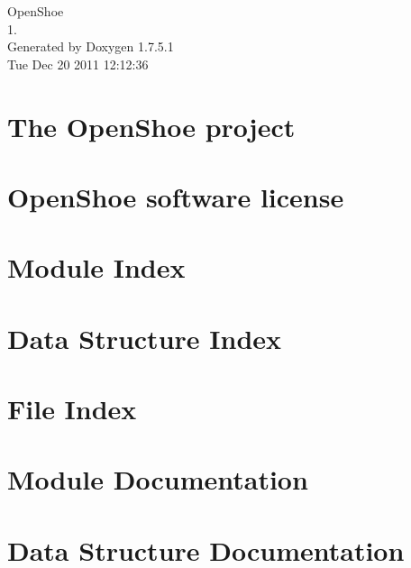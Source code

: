 \documentclass[a4paper]{book}
\begin{document}
\hypersetup{pageanchor=false,citecolor=blue}
\begin{titlepage}
\vspace*{7cm}
\begin{center}
{\Large \-Open\-Shoe \\[1ex]\large 1. }\\
\vspace*{1cm}
{\large \-Generated by Doxygen 1.7.5.1}\\
\vspace*{0.5cm}
{\small Tue Dec 20 2011 12:12:36}\\
\end{center}
\end{titlepage}
\clearemptydoublepage
{}
\tableofcontents
\clearemptydoublepage
{}
\hypersetup{pageanchor=true,citecolor=blue}
\chapter{\-The \-Open\-Shoe project}
\label{index}\hypertarget{index}{}
\chapter{\-Open\-Shoe software license}
\label{isc_license}
\hypertarget{isc_license}{}

\chapter{\-Module \-Index}

\chapter{\-Data \-Structure \-Index}

\chapter{\-File \-Index}

\chapter{\-Module \-Documentation}












\chapter{\-Data \-Structure \-Documentation}



\end{document}
